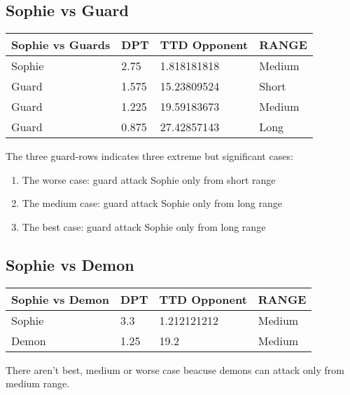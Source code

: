 \subsection{Sophie vs Guard}
\begin{table}[H]
  \centering
\begin{tabular}{|l|l|l|l|}
\hline
\rowcolor[HTML]{C0C0C0} 
\textbf{Sophie vs Guards} & \textbf{DPT} & \textbf{TTD Opponent} & \textbf{RANGE} \\ \hline
Sophie & 2.75 & 1.818181818 & Medium \\ \hline
Guard & 1.575 & 15.23809524 & Short \\ \hline
Guard & 1.225 & 19.59183673 & Medium \\ \hline
Guard & 0.875 & 27.42857143 & Long \\ \hline
\end{tabular}
\end{table}
The three guard-rows indicates three extreme but significant cases:
\begin{enumerate}
\item The worse case: guard attack Sophie only from short range
\item The medium case: guard attack Sophie only  from long range
\item The best case: guard attack Sophie only  from long range
\end{enumerate}
\subsection{Sophie vs Demon}
\begin{table}[H]
  \centering
\begin{tabular}{|l|l|l|l|}
\hline
\rowcolor[HTML]{C0C0C0} 
\textbf{Sophie vs Demon} & \textbf{DPT} & \textbf{TTD Opponent} & \textbf{RANGE} \\ \hline
Sophie & 3.3 & 1.212121212 & Medium \\ \hline
Demon & 1.25 & 19.2 & Medium \\ \hline
\end{tabular}
\end{table}
There aren't best, medium or worse case beacuse demons can attack only from medium range.
